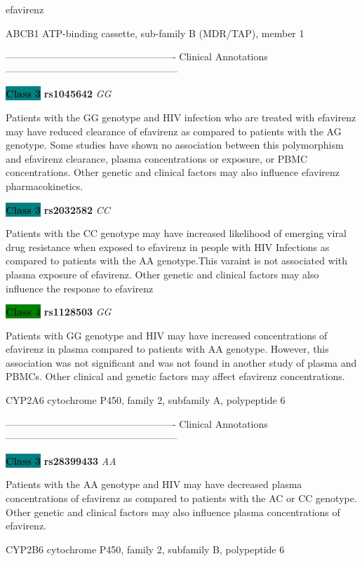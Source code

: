\documentclass{resume} %
\begin{document}
\begin{rSection}{ efavirenz }
\begin{rSubsection}{ ABCB1 }{ ATP-binding cassette, sub-family B (MDR/TAP), member 1 }{}{}
\item[] ---------------------------------------------------- Clinical Annotations -----------------------------------------------------\newline
\item \textbf{\colorbox{teal} {Class 3}} \textbf{ rs1045642 } \textit{ GG }
\item[] Patients with the GG genotype and HIV infection who are treated with efavirenz may have reduced clearance of efavirenz as compared to patients with the AG genotype. Some studies have shown no association between this polymorphism and efavirenz clearance, plasma concentrations or exposure, or PBMC concentrations. Other genetic and clinical factors may also influence efavirenz pharmacokinetics. \item \textbf{\colorbox{teal} {Class 3}} \textbf{ rs2032582 } \textit{ CC }
\item[] Patients with the CC genotype may have increased likelihood of emerging viral drug resistance when exposed to efavirenz in people with HIV Infections as compared to patients with the AA genotype.This varaint is not associated with plasma exposure of efavirenz. Other genetic and clinical factors may also influence the response to efavirenz\item \textbf{\colorbox{green} {Class 4}} \textbf{ rs1128503 } \textit{ GG }
\item[] Patients with GG genotype and HIV may have increased concentrations of efavirenz in plasma compared to patients with AA genotype. However, this association was not significant and was not found in another study of plasma and PBMCs.  Other clinical and genetic factors may affect efavirenz concentrations.
\end{rSubsection}\begin{rSubsection}{ CYP2A6 }{ cytochrome P450, family 2, subfamily A, polypeptide 6 }{}{}
\item[]

\item[] ---------------------------------------------------- Clinical Annotations -----------------------------------------------------\newline
\item \textbf{\colorbox{teal} {Class 3}} \textbf{ rs28399433 } \textit{ AA }
\item[] Patients with the AA genotype and HIV may have decreased plasma concentrations of efavirenz as compared to patients with the AC or CC genotype. Other genetic and clinical factors may also influence plasma concentrations of efavirenz.
\end{rSubsection}\begin{rSubsection}{ CYP2B6 }{ cytochrome P450, family 2, subfamily B, polypeptide 6 }{}{}
\item[]


\end{rSubsection}
\end{rSection}
\end{document}
